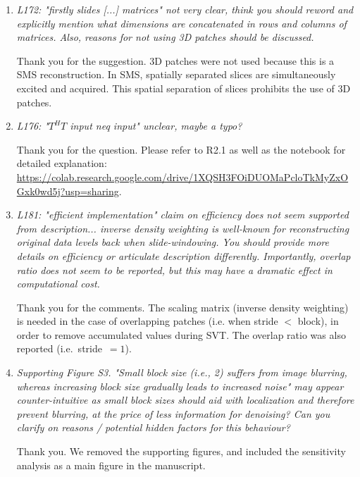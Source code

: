 \documentclass[a4paper,11pt,twoside]{report}
\begin{document}
\begin{enumerate}[resume]
    \item \textit{L172: "firstly slides [...] matrices" \textrightarrow not very clear, think you should reword and explicitly mention what dimensions are concatenated in rows and columns of matrices. Also, reasons for not using 3D patches should be discussed.}

    \hspace{1em} Thank you for the suggestion.
    3D patches were not used because this is a SMS reconstruction.
    In SMS, spatially separated slices
    are simultaneously excited and acquired.
    This spatial separation of slices prohibits the use of 3D patches.

    \item \textit{L176: "$T^HT$ input neq input" \textrightarrow unclear, maybe a typo?}

    \hspace{1em} Thank you for the question.
    Please refer to R2.1 as well as the notebook for detailed explanation:
    \url{https://colab.research.google.com/drive/1XQSH3FOiDUOMaPcloTkMyZxOGxk0wd5j?usp=sharing}.

    \item \textit{L181: "efficient implementation" \textrightarrow claim on efficiency does not seem supported from description... inverse density weighting is well-known for reconstructing original data levels back when slide-windowing. You should provide more details on efficiency or articulate description differently. Importantly, overlap ratio does not seem to be reported, but this may have a dramatic effect in computational cost.}

    \hspace{1em} Thank you for the comments.
    The scaling matrix (inverse density weighting) is needed
    in the case of overlapping patches (i.e. when stride $<$ block),
    in order to remove accumulated values during SVT.
    The overlap ratio was also reported (i.e.~stride~$=1$).

    \item \textit{Supporting Figure S3. "Small block size (i.e., 2) suffers from image blurring, whereas increasing block size gradually leads to increased noise" \textrightarrow may appear counter-intuitive as small block sizes should aid with localization and therefore prevent blurring, at the price of less information for denoising? Can you clarify on reasons / potential hidden factors for this behaviour?}

    \hspace{1em} Thank you. We removed the supporting figures,
    and included the sensitivity analysis as a main figure
    in the manuscript.


\end{enumerate}
\end{document}
